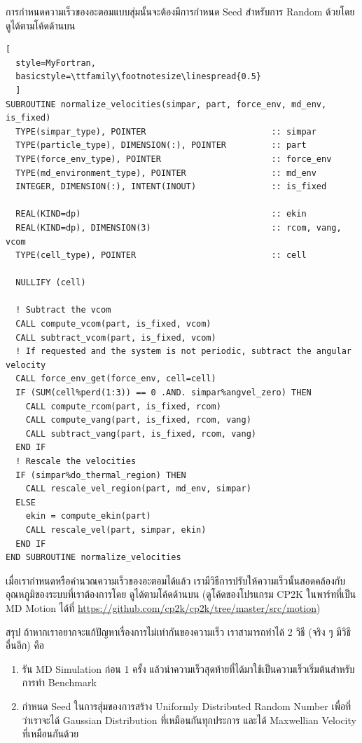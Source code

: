 \vspace{5pt}

\noindent การกำหนดความเร็วของอะตอมแบบสุ่มนั้นจะต้องมีการกำหนด Seed สำหรับการ Random ด้วยโดยดูได้ตามโค้ดด้านบน

\vspace{5pt}

\begin{lstlisting}[
  style=MyFortran,
  basicstyle=\ttfamily\footnotesize\linespread{0.5}
  ]
SUBROUTINE normalize_velocities(simpar, part, force_env, md_env, is_fixed)
  TYPE(simpar_type), POINTER                         :: simpar
  TYPE(particle_type), DIMENSION(:), POINTER         :: part
  TYPE(force_env_type), POINTER                      :: force_env
  TYPE(md_environment_type), POINTER                 :: md_env
  INTEGER, DIMENSION(:), INTENT(INOUT)               :: is_fixed

  REAL(KIND=dp)                                      :: ekin
  REAL(KIND=dp), DIMENSION(3)                        :: rcom, vang, vcom
  TYPE(cell_type), POINTER                           :: cell

  NULLIFY (cell)

  ! Subtract the vcom
  CALL compute_vcom(part, is_fixed, vcom)
  CALL subtract_vcom(part, is_fixed, vcom)
  ! If requested and the system is not periodic, subtract the angular velocity
  CALL force_env_get(force_env, cell=cell)
  IF (SUM(cell%perd(1:3)) == 0 .AND. simpar%angvel_zero) THEN
    CALL compute_rcom(part, is_fixed, rcom)
    CALL compute_vang(part, is_fixed, rcom, vang)
    CALL subtract_vang(part, is_fixed, rcom, vang)
  END IF
  ! Rescale the velocities
  IF (simpar%do_thermal_region) THEN
    CALL rescale_vel_region(part, md_env, simpar)
  ELSE
    ekin = compute_ekin(part)
    CALL rescale_vel(part, simpar, ekin)
  END IF
END SUBROUTINE normalize_velocities
\end{lstlisting}

\vspace{5pt}

\noindent เมื่อเรากำหนดหรือคำนวณความเร็วของอะตอมได้แล้ว เรามีวิธีการปรับให้ความเร็วนั้นสอดคล้องกับอุณหภูมิของระบบที่เราต้องการโดย%
ดูได้ตามโค้ดด้านบน (ดูโค้ดของโปรแกรม CP2K ในพาร์ทที่เป็น MD Motion ได้ที่
\url{https://github.com/cp2k/cp2k/tree/master/src/motion})

สรุป ถ้าหากเราอยากจะแก้ปัญหาเรื่องการไม่เท่ากันของความเร็ว เราสามารถทำได้ 2 วิธี (จริง ๆ มีวิธีอื่นอีก) คือ

\begin{enumerate}[topsep=0pt,noitemsep]
  \setlength\itemsep{0.5em}
  \item รัน MD Simulation ก่อน 1 ครั้ง แล้วนำความเร็วสุดท้ายที่ได้มาใช้เป็นความเร็วเริ่มต้นสำหรับการทำ Benchmark

  \item กำหนด Seed ในการสุ่มของการสร้าง Uniformly Distributed Random Number เพื่อที่ว่าเราจะได้ Gaussian Distribution
        ที่เหมือนกันทุกประการ และได้ Maxwellian Velocity ที่เหมือนกันด้วย
\end{enumerate}

